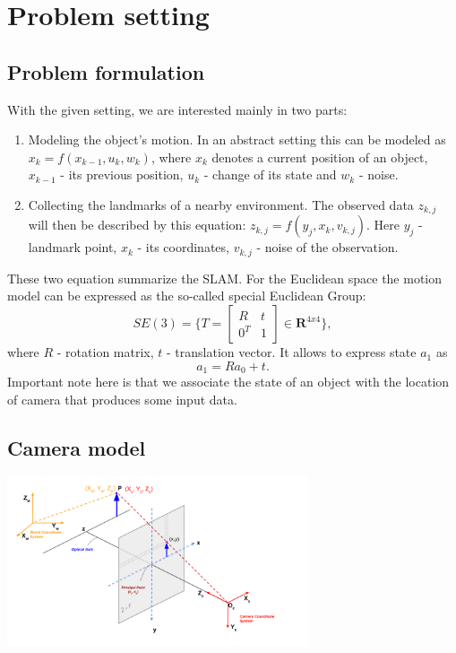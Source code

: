 \section{Problem setting}

\subsection{Problem formulation}

With the given setting, we are interested mainly in two parts:
\begin{enumerate}
    \item Modeling the object's motion. In an abstract setting this can be modeled as $x_{k} = f(x_{k - 1}, u_{k}, w_{k})$, where $x_{k}$ denotes a current position of an object, $x_{k - 1}$ - its previous position, $u_{k}$ - change of its state and $w_{k}$ - noise.  
    \item Collecting the landmarks of a nearby environment. The observed data $z_{k, j}$ will then be described by this equation: $z_{k, j} = f(y_{j}, x_{k}, v_{k, j})$. Here $y_{j}$ - landmark point, $x_{k}$ - its coordinates, $v_{k, j}$ - noise of the observation.
\end{enumerate}

These two equation summarize the SLAM. For the Euclidean space the motion model can be expressed as the so-called special Euclidean Group: $$SE(3) = \{ T =
\begin{bmatrix}
    R    &  t      \\
    0^T  &  1      
\end{bmatrix} \in \mathbf{R}^{4x4} \},$$ where $R$ - rotation matrix, $t$ - translation vector. It allows to express state $a_{1}$ as $$a_{1} = R a_{0} + t.$$ Important note here is that we associate the state of an object with the location of camera that produces some input data.

\subsection{Camera model}

\begin{center}
    \includegraphics[height=5cm]{camera_model.png}
\end{center}

